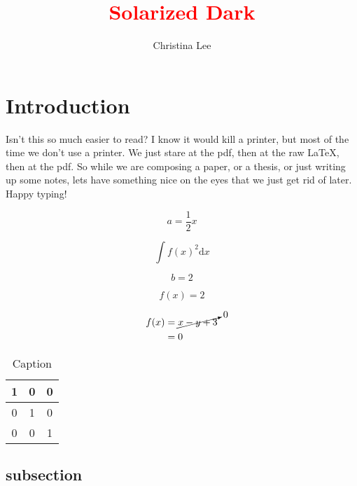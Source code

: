 \documentclass{article}
\title{\textcolor{red}{Solarized Dark}}
\author{Christina Lee}
\date{}
\begin{document}
\pagecolor{base03}
\color{base1}



\maketitle


\section{Introduction}
Isn't this so much easier to read? I know it would kill a printer, but most of the time we don't use a printer.  We just stare at the pdf, then at the raw LaTeX, then at the pdf.  So while we are composing a paper, or a thesis, or just writing up some notes, lets have something nice on the eyes that we just get rid of later.  Happy typing!


\begin{equation}
    a=\frac{1}{2} x
\end{equation}

\begin{equation*}
    \int f(x)^2 \mathrm{d}x
\end{equation*}

\[
    b=2
\]


\begin{tcolorbox}
\[
f(x)=2
\]
\end{tcolorbox}

\begin{align}
f(x)&=\cancelto{0}{x-y+3} \nonumber\\
&=0
\end{align}

\begin{table}
    \centering
    \begin{tabular}{c|c | c}
    1     & 0 & 0\\
    \hline
    0     & 1   &   0   \\
    \hline
    0   &   0   &   1
    \end{tabular}
    \caption{Caption}
    \label{tab:my_label}
\end{table}

\subsection{subsection}
\end{document}
